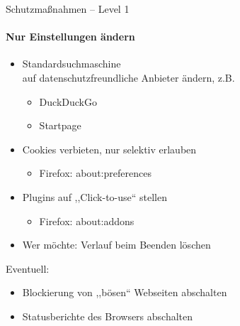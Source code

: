 \begin{frame}{Schutzmaßnahmen -- Level 1}
\framesubtitle{Nur Einstellungen ändern}
  \begin{itemize}
    \item Standardsuchmaschine\\ auf datenschutzfreundliche Anbieter ändern, z.B.
    \begin{itemize}
      \item DuckDuckGo
      \item Startpage
    \end{itemize}
    \item Cookies verbieten, nur selektiv erlauben
    \begin{itemize}
      \item Firefox: about:preferences
    \end{itemize}
    \item Plugins auf ,,Click-to-use`` stellen
    \begin{itemize}
      \item Firefox: about:addons
    \end{itemize}
    \item Wer möchte: Verlauf beim Beenden löschen
  \end{itemize}

  Eventuell:
  \begin{itemize}
    \item Blockierung von ,,bösen`` Webseiten abschalten
    \item Statusberichte des Browsers abschalten
  \end{itemize}
\end{frame}

